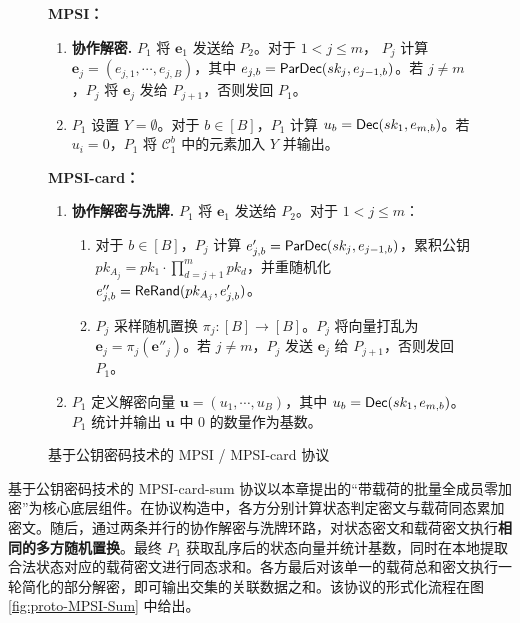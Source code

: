 \begin{figure}[!htb]
\begin{framed}
\begin{minipage}[c]{\textwidth}
    \textbf{MPSI：} 
    \begin{enumerate}[itemsep=2pt,topsep=0pt,parsep=0pt] \addtocounter{enumi}{3}
    \item \textbf{协作解密.} $P_1$ 将 $\textbf{e}_1$ 发送给 $P_{2}$。对于 $1 < j \le m$， $P_j$ 计算 $\textbf{e}_j = (e_{j,1},\cdots,e_{j,B})$，其中 $e_{j,b} = \mathsf{ParDec}(sk_j,e_{j-1,b})$。若 $j \ne m$，$P_j$ 将 $\textbf{e}_{j}$ 发给 $P_{j+1}$，否则发回 $P_{1}$。
    \item $P_{1}$ 设置 $Y = \emptyset$。对于 $b \in [B]$，$P_1$ 计算 $u_b = \mathsf{Dec}(sk_1,e_{m,b})$。若 $u_i = 0$，$P_1$ 将 $\mathcal{C}_1^b$ 中的元素加入 $Y$ 并输出。      
    \end{enumerate}
    \textbf{MPSI-card：} 
    \begin{enumerate}[itemsep=2pt,topsep=0pt,parsep=0pt] \addtocounter{enumi}{3}
        \item \textbf{协作解密与洗牌.} $P_1$ 将 $\textbf{e}_1$ 发送给 $P_{2}$。对于 $1 < j \le m$： 
        \begin{enumerate}[itemsep=2pt,topsep=0pt,parsep=0pt]
        \item 对于 $b \in [B]$，$P_j$ 计算 $e'_{j,b} = \mathsf{ParDec}(sk_j,e_{j-1,b})$，累积公钥 $pk_{A_j} = pk_1 \cdot \prod_{d = j+1}^m pk_d$，并重随机化 $e''_{j,b} = \mathsf{ReRand}(pk_{A_j},e'_{j,b})$。 
        \item $P_j$ 采样随机置换 $\pi_j:[B] \to [B]$。$P_j$ 将向量打乱为 $\textbf{e}_{j} = {\pi_j}(\textbf{e}''_{j})$。若 $j \ne m$，$P_j$ 发送 $\textbf{e}_{j}$ 给 $P_{j+1}$，否则发回 $P_{1}$。
        \end{enumerate}
        \item $P_{1}$ 定义解密向量 $\textbf{u} = (u_1, \cdots, u_{B})$，其中 $u_b = \mathsf{Dec}(sk_1,e_{m,b})$。$P_1$ 统计并输出 $\textbf{u}$ 中 0 的数量作为基数。
    \end{enumerate}
\end{minipage}
\end{framed}
\caption{基于公钥密码技术的 MPSI / MPSI-card 协议}\label{fig:proto-MPSI}
\end{figure} 

基于公钥密码技术的 MPSI-card-sum 协议以本章提出的“带载荷的批量全成员零加密”为核心底层组件。在协议构造中，各方分别计算状态判定密文与载荷同态累加密文。随后，通过两条并行的协作解密与洗牌环路，对状态密文和载荷密文执行\textbf{相同的多方随机置换}。最终 $P_1$ 获取乱序后的状态向量并统计基数，同时在本地提取合法状态对应的载荷密文进行同态求和。各方最后对该单一的载荷总和密文执行一轮简化的部分解密，即可输出交集的关联数据之和。该协议的形式化流程在图 \ref{fig:proto-MPSI-Sum} 中给出。

